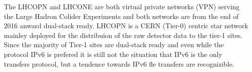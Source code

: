 

The LHCOPN and LHCONE are both virtual private networks (VPN) serving the Large Hadron Colider Experiments and both networks are from the end of 2016 anward dual-stack ready. LHCOPN is a CERN (Tier-0) centric star network mainley deployed for the distribuion of the raw detector data to the tier-1 sites. Since the majority of Tier-1 sites are dual-stack ready and even while the protocol IPv6 is prefered it is still not the situation that IPv6 is the only transfers protocol, but a tendence towards IPv6 fle transfers are recognizible.  
